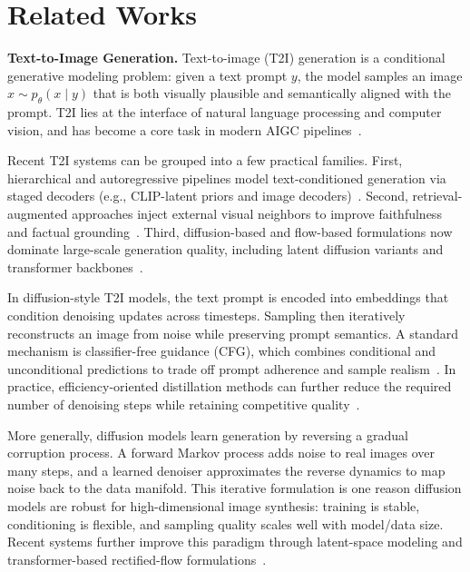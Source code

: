
\section{Related Works}

\noindent\textbf{Text-to-Image Generation.}
Text-to-image (T2I) generation is a conditional generative modeling problem: given a text prompt \(y\), the model samples an image \(x \sim p_\theta(x \mid y)\) that is both visually plausible and semantically aligned with the prompt. T2I lies at the interface of natural language processing and computer vision, and has become a core task in modern AIGC pipelines~\cite{shi2020captioning,ramesh2022hierarchical}.

Recent T2I systems can be grouped into a few practical families. First, hierarchical and autoregressive pipelines model text-conditioned generation via staged decoders (e.g., CLIP-latent priors and image decoders)~\cite{ramesh2022hierarchical}. Second, retrieval-augmented approaches inject external visual neighbors to improve faithfulness and factual grounding~\cite{blattmann2022retrieval,chen2022reimagen}. Third, diffusion-based and flow-based formulations now dominate large-scale generation quality, including latent diffusion variants and transformer backbones~\cite{podell2024sdxl,chen2024pixartsigma}.

In diffusion-style T2I models, the text prompt is encoded into embeddings that condition denoising updates across timesteps. Sampling then iteratively reconstructs an image from noise while preserving prompt semantics. A standard mechanism is classifier-free guidance (CFG), which combines conditional and unconditional predictions to trade off prompt adherence and sample realism~\cite{ho2022classifierfree}. In practice, efficiency-oriented distillation methods can further reduce the required number of denoising steps while retaining competitive quality~\cite{sauer2024add}.

More generally, diffusion models learn generation by reversing a gradual corruption process. A forward Markov process adds noise to real images over many steps, and a learned denoiser approximates the reverse dynamics to map noise back to the data manifold. This iterative formulation is one reason diffusion models are robust for high-dimensional image synthesis: training is stable, conditioning is flexible, and sampling quality scales well with model/data size. Recent systems further improve this paradigm through latent-space modeling and transformer-based rectified-flow formulations~\cite{podell2024sdxl,scaling_rectified_flow_transformers_for_high_resolution_image_synthesis}.

